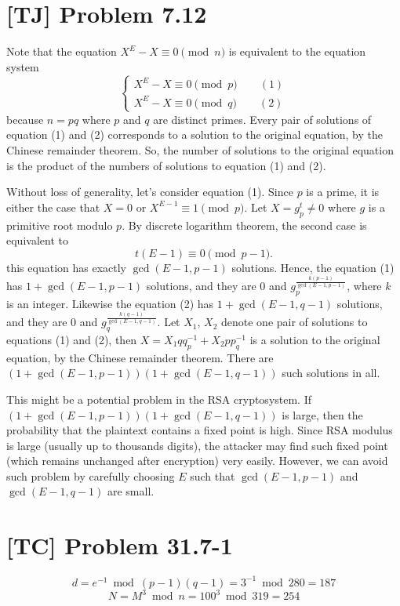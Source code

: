 \documentclass[a4paper,11pt]{article}
\begin{document}
  \section{[TJ] Problem 7.12}
  Note that the equation $X^E - X \equiv 0 \pmod n$ is equivalent to the equation system
$$ \begin{cases} X^E - X \equiv 0 \pmod p \qquad (1)\\ X^E - X \equiv 0 \pmod q \qquad (2) \end{cases} $$
  because $n = pq$ where $p$ and $q$ are distinct primes. Every pair of solutions of equation (1) and (2) corresponds to a solution to the original equation, by the Chinese remainder theorem. So, the number of solutions to the original equation is the product of the numbers of solutions to equation (1) and (2). \par
  Without loss of generality, let's consider equation (1). Since $p$ is a prime, it is either the case that $X = 0$ or $X^{E-1} \equiv 1 \pmod p$. Let $X = g_p^t \neq 0$ where $g$ is a primitive root modulo $p$. By discrete logarithm theorem, the second case is equivalent to
  $$t(E-1) \equiv 0 \pmod{p-1}.$$
  this equation has exactly $\gcd(E-1, p-1)$ solutions. Hence, the equation (1) has $1 + \gcd(E-1, p-1)$ solutions, and they are $0$ and $g_p^{\frac{k(p-1)}{\gcd(E-1, p-1)}}$, where $k$ is an integer. Likewise the equation (2) has $1 + \gcd(E-1, q-1)$ solutions, and they are $0$ and $g_q^{\frac{k(q-1)}{\gcd(E-1, q-1)}}$. Let $X_1$, $X_2$ denote one pair of solutions to equations (1) and (2), then $X = X_1 q q^{-1}_p + X_2 p p^{-1}_q$ is a solution to the original equation, by the Chinese remainder theorem. There are $(1 + \gcd(E-1, p-1))(1 + \gcd(E-1, q-1))$ such solutions in all. \par
  This might be a potential problem in the RSA cryptosystem. If $(1 + \gcd(E-1, p-1))(1 + \gcd(E-1, q-1))$ is large, then the probability that the plaintext contains a fixed point is high. Since RSA modulus is large (usually up to thousands digits), the attacker may find such fixed point (which remains unchanged after encryption) very easily. However, we can avoid such problem by carefully choosing $E$ such that $\gcd(E-1, p-1)$ and $\gcd(E-1, q-1)$ are small.

  \section{[TC] Problem 31.7-1}
  $$ d = e^{-1} \bmod (p-1)(q-1) = 3^{-1} \bmod 280 = 187 $$
  $$ N = M^{3} \bmod n = 100^3 \bmod 319 = 254 $$
  
\end{document}

